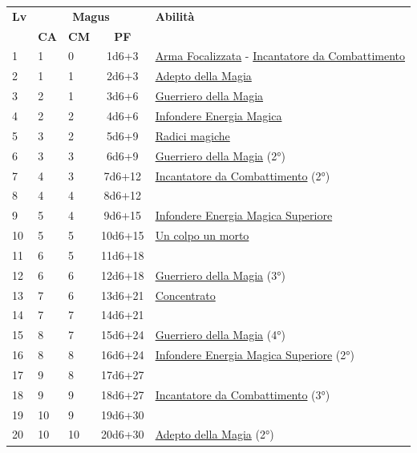 {\begin{multicols}{2}



\noindent\begin{tabularx}{\linewidth}{p{0.3cm}|p{0.3cm}p{0.3cm}c|X|}
	\toprule
 \rowcolor{gray!20}	\textbf{Lv} & \multicolumn{3}{c|}{\textbf{Magus}} & \textbf{Abilità} \\
& \centering\arraybackslash \textbf{CA} & \centering\arraybackslash \textbf{CM} & \centering\arraybackslash \textbf{PF} & \\
	\toprule
	1 &1	& 0	&	1d6+3	&\hyperlink{Arma Focalizzata}{Arma Focalizzata} - \hyperlink{Incantatore da Combattimento}{Incantatore da Combattimento}\\
 \rowcolor{gray!20}2	&	1	& 1	&	2d6+3	&\hyperlink{Adepto della Magia}{Adepto della Magia}\\
	3	&	2	& 1	&	3d6+6	&\hyperlink{Guerriero della Magia}{Guerriero della Magia}\\
 \rowcolor{gray!20}4	&	2	& 2	&	4d6+6	&\hyperlink{Infondere Energia Magica}{Infondere Energia Magica}\\
	5	&	3	& 2	&	5d6+9	&\hyperlink{Radici magiche}{Radici magiche}\\
 \rowcolor{gray!20}6	&	3	& 3	&	6d6+9	&\hyperlink{Guerriero della Magia}{Guerriero della Magia} (2°)\\
	7	&	4	& 3	&	7d6+12	&\hyperlink{Incantatore da Combattimento}{Incantatore da Combattimento} (2°)\\
 \rowcolor{gray!20}8	&	4	& 4	&	8d6+12	&\\
	9	&	5	& 4	&	9d6+15	&\hyperlink{Infondere Energia Magica Superiore}{Infondere Energia Magica Superiore}\\
 \rowcolor{gray!20}10	&	5	& 5	&	10d6+15	&\hyperlink{Un colpo un morto}{Un colpo un morto}\\
	11	&	6	& 5	&	11d6+18	&\\
 \rowcolor{gray!20}12	&	6	& 6	&	12d6+18	&\hyperlink{Guerriero della Magia}{Guerriero della Magia} (3°)\\
	13	&	7	& 6	&	13d6+21	&\hyperlink{Concentrato}{Concentrato}\\
 \rowcolor{gray!20}14	&	7	& 7	&	14d6+21	&\\
	15	&	8	& 7	&	15d6+24	&\hyperlink{Guerriero della Magia}{Guerriero della Magia} (4°)\\
 \rowcolor{gray!20}16	&	8	& 8	&	16d6+24	&\hyperlink{Infondere Energia Magica Superiore}{Infondere Energia Magica Superiore} (2°)\\
	17	&	9	& 8	&	17d6+27	&\\
 \rowcolor{gray!20}18	&	9	& 9	&	18d6+27	&\hyperlink{Incantatore da Combattimento}{Incantatore da Combattimento} (3°)\\
	19	&	10	& 9	&	19d6+30	&\\
 \rowcolor{gray!20}20	&	10	& 10	&	20d6+30	&\hyperlink{Adepto della Magia}{Adepto della Magia} (2°)\\
\end{tabularx}


\end{multicols}

}

\pagebreak
